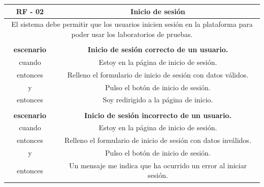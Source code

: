         \begin{table}[!htbp]
            \centering

            \begin{tabular}{|c|c|}
                \hline
                \textbf{RF - 02} & \textbf{Inicio de sesión} \\
                \hline
                \multicolumn{2}{|p{15cm}|}{
                    El sistema debe permitir que los usuarios inicien sesión en la plataforma para poder usar los laboratorios de pruebas.
                } \\                    
                \hline
                \multicolumn{2}{|p{15cm}|}{
                } \\
                \hline
                \textbf{escenario} & \textbf{Inicio de sesión correcto de un usuario.} \\
                cuando & Estoy en la página de inicio de sesión. \\
                entonces & Relleno el formulario de inicio de sesión con datos válidos. \\
                y & Pulso el botón de inicio de sesión. \\
                entonces & Soy redirigido a la página de inicio. \\
                \hline
                \multicolumn{2}{|p{15cm}|}{
                } \\
                \hline
                \textbf{escenario} & \textbf{Inicio de sesión incorrecto de un usuario.} \\
                cuando & Estoy en la página de inicio de sesión. \\
                entonces & Relleno el formulario de inicio de sesión con datos inválidos. \\
                y & Pulso el botón de inicio de sesión. \\
                entonces & Un mensaje me indica que ha ocurrido un error al iniciar sesión. \\
                \hline
            \end{tabular}
        \end{table}


